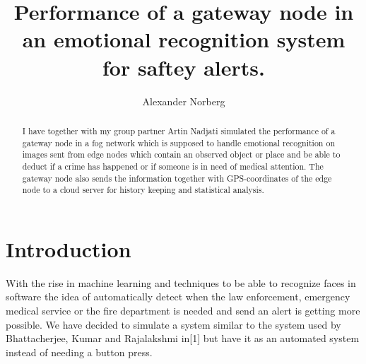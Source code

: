 \documentclass[a4paper,11pt,notitlepage,twocolumn]{article}
\title{Performance of a gateway node in an emotional recognition system for saftey alerts.}
\author{Alexander Norberg}
\begin{document}
%
  \maketitle
  \begin{abstract}
    I have together with my group partner Artin Nadjati simulated the performance of a
    gateway node in a fog network which is supposed to handle emotional recognition on
    images sent from edge nodes which contain an observed object or place and be able to
    deduct if a crime has happened or if someone is in need of medical attention. The
    gateway node also sends the information together with GPS-coordinates of the edge
    node to a cloud server for history keeping and statistical analysis.
  \end{abstract}
  
  \section{Introduction}
    With the rise in machine learning and techniques to be able to recognize faces in
    software the idea of automatically detect when the law enforcement, emergency medical
    service or the fire department is needed and send an alert is getting more possible.
    We have decided to simulate a system similar to the system used by Bhattacherjee, Kumar
    and Rajalakshmi in[1] but have it as an automated system instead of needing a button
    press.
\end{document}
